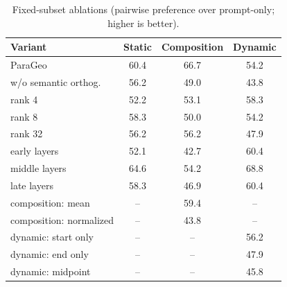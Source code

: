 \begin{table}[t]
\centering
\caption{Fixed-subset ablations (pairwise preference over prompt-only; higher is better).}
\label{tab:ablation}
\begin{tabular}{lccc}
\hline
Variant & Static & Composition & Dynamic \\
\hline
ParaGeo & 60.4 & 66.7 & 54.2 \\
w/o semantic orthog. & 56.2 & 49.0 & 43.8 \\
rank 4 & 52.2 & 53.1 & 58.3 \\
rank 8 & 58.3 & 50.0 & 54.2 \\
rank 32 & 56.2 & 56.2 & 47.9 \\
early layers & 52.1 & 42.7 & 60.4 \\
middle layers & 64.6 & 54.2 & 68.8 \\
late layers & 58.3 & 46.9 & 60.4 \\
composition: mean & -- & 59.4 & -- \\
composition: normalized & -- & 43.8 & -- \\
dynamic: start only & -- & -- & 56.2 \\
dynamic: end only & -- & -- & 47.9 \\
dynamic: midpoint & -- & -- & 45.8 \\
\hline
\end{tabular}
\end{table}
